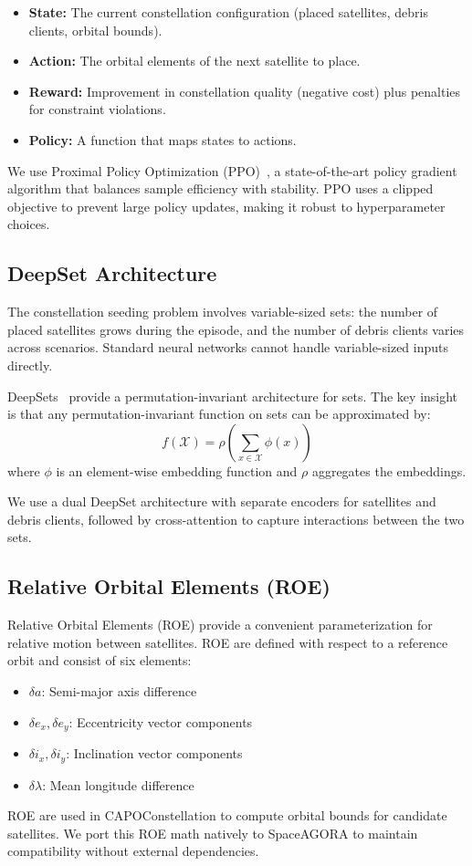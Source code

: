 \begin{itemize}
    \item \textbf{State:} The current constellation configuration (placed satellites, debris clients, orbital bounds).
    \item \textbf{Action:} The orbital elements of the next satellite to place.
    \item \textbf{Reward:} Improvement in constellation quality (negative cost) plus penalties for constraint violations.
    \item \textbf{Policy:} A function that maps states to actions.
\end{itemize}

We use Proximal Policy Optimization (PPO)~\cite{schulman2017proximal}, a state-of-the-art policy gradient algorithm that balances sample efficiency with stability. PPO uses a clipped objective to prevent large policy updates, making it robust to hyperparameter choices.

\subsection{DeepSet Architecture}

The constellation seeding problem involves variable-sized sets: the number of placed satellites grows during the episode, and the number of debris clients varies across scenarios. Standard neural networks cannot handle variable-sized inputs directly.

DeepSets~\cite{zaheer2017deep} provide a permutation-invariant architecture for sets. The key insight is that any permutation-invariant function on sets can be approximated by:
\begin{equation}
    f(\mathcal{X}) = \rho\left(\sum_{x \in \mathcal{X}} \phi(x)\right)
\end{equation}
where $\phi$ is an element-wise embedding function and $\rho$ aggregates the embeddings.

We use a dual DeepSet architecture with separate encoders for satellites and debris clients, followed by cross-attention to capture interactions between the two sets.

\subsection{Relative Orbital Elements (ROE)}

Relative Orbital Elements (ROE) provide a convenient parameterization for relative motion between satellites. ROE are defined with respect to a reference orbit and consist of six elements:
\begin{itemize}
    \item $\delta a$: Semi-major axis difference
    \item $\delta e_x, \delta e_y$: Eccentricity vector components
    \item $\delta i_x, \delta i_y$: Inclination vector components
    \item $\delta \lambda$: Mean longitude difference
\end{itemize}

ROE are used in CAPOConstellation to compute orbital bounds for candidate satellites. We port this ROE math natively to SpaceAGORA to maintain compatibility without external dependencies.
